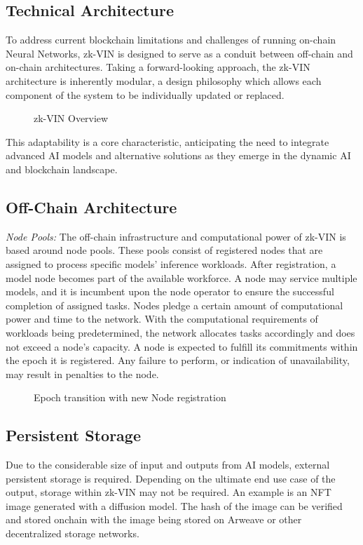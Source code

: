 \documentclass[conference]{IEEEtran}
\begin{document}
\subsection{Technical Architecture}
To address current blockchain limitations and challenges of running on-chain Neural Networks, zk-VIN is designed to serve as a conduit between off-chain and on-chain architectures. Taking a forward-looking approach, the zk-VIN architecture is inherently modular, a design philosophy which allows each component of the system to be individually updated or replaced.

\begin{figure}[!ht]
    \centering
    
    \caption{zk-VIN Overview}
    \label{fig:Fig 5}
\end{figure}
This adaptability is a core characteristic, anticipating the need to integrate advanced AI models and alternative solutions as they emerge in the dynamic AI and blockchain landscape.
\subsection{Off-Chain Architecture}
\textit{Node Pools: }The off-chain infrastructure and computational power of zk-VIN is based around node pools. These pools consist of registered nodes that are assigned to process specific models' inference workloads. After registration, a model node becomes part of the available workforce. A node may service multiple models, and it is incumbent upon the node operator to ensure the successful completion of assigned tasks. Nodes pledge a certain amount of computational power and time to the network. With the computational requirements of workloads being predetermined, the network allocates tasks accordingly and does not exceed a node's capacity. A node is expected to fulfill its commitments within the epoch it is registered. Any failure to perform, or indication of unavailability, may result in penalties to the node.

\begin{figure}[!ht]
    \centering
    
    \caption{Epoch transition with new Node registration}
    \label{fig:Fig 6}
\end{figure}

\subsection{Persistent Storage}
Due to the considerable size of input and outputs from AI models, external persistent storage is required. Depending on the ultimate end use case of the output, storage within zk-VIN may not be required. An example is an NFT image generated with a diffusion model. The hash of the image can be verified and stored onchain with the image being stored on Arweave or other decentralized storage networks.
\end{document}
